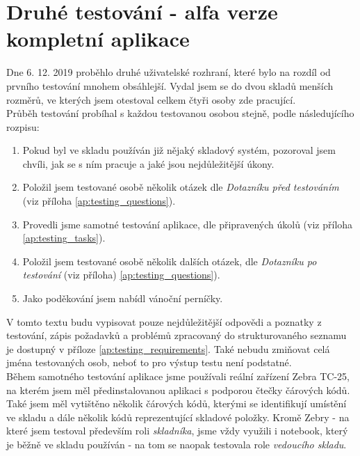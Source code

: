 \section{Druhé testování - alfa verze kompletní aplikace}\label{sec:usertest}

Dne 6. 12. 2019 proběhlo druhé uživatelské rozhraní, které bylo na rozdíl od prvního testování mnohem obsáhlejší. Vydal jsem se do dvou skladů menších rozměrů, ve kterých jsem otestoval celkem čtyři osoby zde pracující.\\
Průběh testování probíhal s každou testovanou osobou stejně, podle následujícího rozpisu:
\begin{enumerate}
	\item Pokud byl ve skladu používán již nějaký skladový systém, pozoroval jsem chvíli, jak se s ním pracuje a jaké jsou nejdůležitější úkony.
	\item Položil jsem testované osobě několik otázek dle \emph{Dotazníku před testováním} (viz příloha \ref{ap:testing_questions}).
	\item Provedli jsme samotné testování aplikace, dle připravených úkolů (viz příloha \ref{ap:testing_tasks}).
	\item Položil jsem testované osobě několik dalších otázek, dle \emph{Dotazníku po testování} (viz příloha) \ref{ap:testing_questions}).
	\item Jako poděkování jsem nabídl vánoční perníčky.
\end{enumerate}

V tomto textu budu vypisovat pouze nejdůležitější odpovědi a poznatky z testování, zápis požadavků a problémů zpracovaný do strukturovaného seznamu je dostupný v příloze \ref{ap:testing_requirements}. Také nebudu zmiňovat celá jména testovaných osob, neboť to pro výstup testu není podstatné.
\\
Během samotného testování aplikace jsme používali reální zařízení Zebra TC-25, na kterém jsem měl předinstalovanou aplikaci s podporou čtečky čárových kódů. Také jsem měl vytištěno několik čárových kódů, kterými se identifikují umístění ve skladu a dále několik kódů reprezentující skladové položky. Kromě Zebry - na které jsem testoval především roli \emph{skladníka}, jsme vždy využili i notebook, který je běžně ve skladu používán - na tom se naopak testovala role \emph{vedoucího skladu}.


